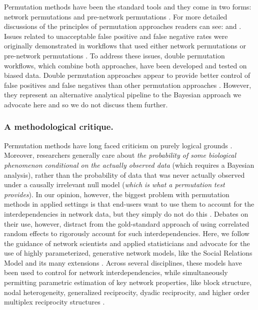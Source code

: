 \documentclass[Afour,sageh,times]{sagej}
\begin{document}
Permutation methods have been the standard tools and they come in two forms: network permutations and pre-network permutations \citep{Farine2013}. For more detailed discussions of the principles of permutation approaches readers can see: \citet{Farine2013} and \citet{sosa2021reliable}. 
 Issues related to unacceptable false positive and false negative rates were originally demonstrated in workflows that used either network permutations or pre-network permutations \citep{Puga2021, Hart2022}. To address these issues, double permutation workflows, which combine both approaches, have been developed and tested on biased data. Double permutation approaches appear to provide better control of false positives and false negatives than other permutation approaches \citep{Farine2022}. However, they represent an alternative analytical pipeline to the Bayesian approach we advocate here and so we do not discuss them further. 

 \subsubsection{A methodological critique.}
  Permutation methods have long faced criticism on purely logical grounds \citep[see:][]{krackhardt1992caveat}. Moreover, researchers generally care about \emph{the probability of some biological phenomenon conditional on the actually observed data} (which requires a Bayesian analysis), rather than the probability of data that was never actually observed under a causally irrelevant null model (\emph{which is what a permutation test provides}). %
  In our opinion, however, the biggest problem with permutation methods in applied settings is that end-users want to use them to account for the interdependencies in network data, but they simply do not do this \citep{Hart2022}. Debates on their use, however, distract from the gold-standard approach of using correlated random effects to rigorously account for such interdependencies. Here, we follow the guidance of network scientists and applied statisticians \citep{snijders1999social} and advocate for the use of highly parameterized, generative network models, like the Social Relations Model \citep{kenny1984social} and its many extensions \citep{back2010social, christensen2003social, eichelsheim2009social, koster2014food, detroy2021cofeeding, redhead2023friendship, pisor2020preferences}. Across several disciplines, these models have been used to control for network interdependencies, while simultaneously permitting parametric estimation of key network properties, like block structure, nodal heterogeneity, generalized reciprocity, dyadic reciprocity, and higher order multiplex reciprocity structures \citep{redhead2024evidence}. 
 
\end{document}
